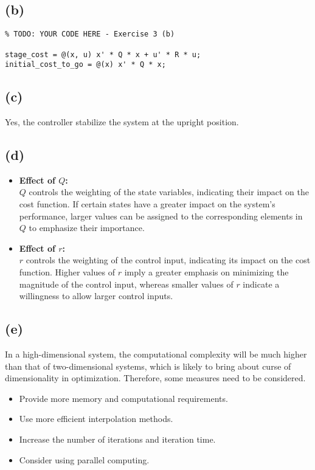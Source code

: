\documentclass[8pt, a4paper, oneside, justified]{article}
\numberwithin{equation}{section}
\begin{document}
\subsection*{(b)}

\begin{lstlisting}
% TODO: YOUR CODE HERE - Exercise 3 (b)

stage_cost = @(x, u) x' * Q * x + u' * R * u;
initial_cost_to_go = @(x) x' * Q * x;
\end{lstlisting}

\subsection*{(c)}

Yes, the controller stabilize the system at the upright position.

\subsection*{(d)}

\begin{itemize}
    \item \textbf{Effect of $Q$:} \\
    $Q$ controls the weighting of the state variables, indicating their impact on the cost function. 
    If certain states have a greater impact on the system's performance, larger values can be 
    assigned to the corresponding elements in $Q$ to emphasize their importance.
    \item \textbf{Effect of $r$:} \\
    $r$ controls the weighting of the control input, indicating its impact on the cost function. 
    Higher values of $r$ imply a greater emphasis on minimizing the magnitude of the control input, 
    whereas smaller values of $r$ indicate a willingness to allow larger control inputs.
\end{itemize}

\subsection*{(e)}
In a high-dimensional system, the computational complexity will be much higher than 
that of two-dimensional systems, which is likely to bring about curse of dimensionality 
in optimization. Therefore, some measures need to be considered.
\begin{itemize}
    \item Provide more memory and computational requirements.
    \item Use more efficient interpolation methods.
    \item Increase the number of iterations and iteration time.
    \item Consider using parallel computing.
\end{itemize}
\end{document}
